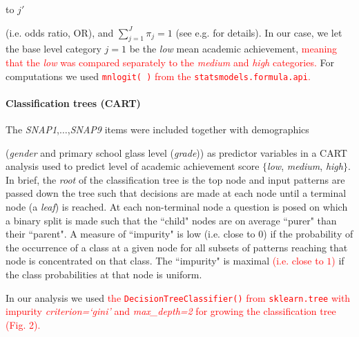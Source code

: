\documentclass[10pt,letterpaper]{article}
\begin{document}
to $j'$ {(i.e. odds ratio, OR), and $\sum_{j=1}^J \pi_j = 1$ (see e.g. \cite{Bilder2015} for details).
In our case, we let the base level category $j=1$ be the {\it low} mean academic achievement, \textcolor{red}{meaning that the {\it low} was compared separately to 
the {\it medium} and {\it high} categories.}
For computations we used  \textcolor{red}{{\tt \small mnlogit( )} from the {\tt \small statsmodels.formula.api}.} \\

\vspace{3mm}

\paragraph{Classification trees (CART)}
The {\it SNAP1},$\ldots$,{\it SNAP9} items were included together with demographics {(\emph{gender} and primary school glass level ({\it grade})) as predictor variables in a CART analysis \cite{Breiman2001} used to predict level of academic achievement score $\{$\emph{low}, \emph{medium}, \emph{high}$\}$.
In brief, the \emph{root} of the classification tree is the top node and input patterns are passed down the tree such that decisions are made at each node until a terminal 
node (a \emph{leaf}) is reached. At each non-terminal node a question is posed on which a binary split is made such that the ``child" nodes are on average ``purer" than their ``parent". 
A measure of ``impurity" is 
low (i.e. close to $0$) if the probability of the occurrence of a class at a given node for all subsets of patterns reaching that node is concentrated on that class. 
The ``impurity" is maximal \textcolor{red}{(i.e. close to $1$)} if the class probabilities at that node is uniform. 
         
In our analysis we used \textcolor{red}{the {\tt \small DecisionTreeClassifier()}  from {\tt \small sklearn.tree} with impurity {\it criterion=`gini'} and {\it max\_depth=2}
for growing the classification tree (Fig. 2).}

}}
\end{document}
